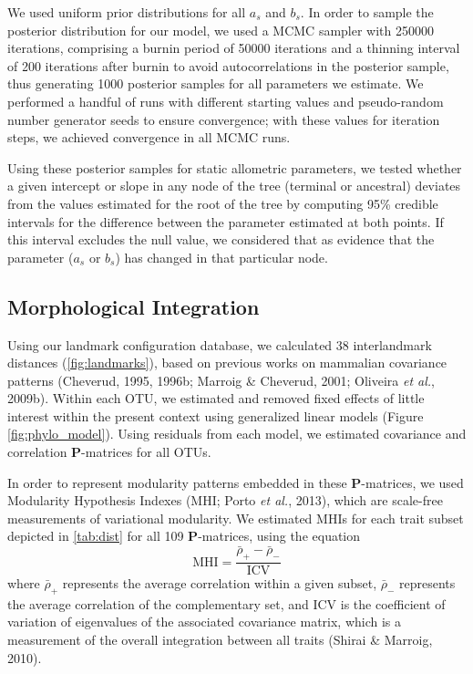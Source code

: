 \documentclass[12pt,twoside]{report}
\begin{document}
We used uniform prior distributions for all $a_s$ and $b_s$. In order to
sample the posterior distribution for our model, we used a MCMC sampler
with 250000 iterations, comprising a burnin period of 50000 iterations
and a thinning interval of 200 iterations after burnin to avoid
autocorrelations in the posterior sample, thus generating 1000 posterior
samples for all parameters we estimate. We performed a handful of runs
with different starting values and pseudo-random number generator seeds
to ensure convergence; with these values for iteration steps, we
achieved convergence in all MCMC runs.

Using these posterior samples for static allometric parameters, we
tested whether a given intercept or slope in any node of the tree
(terminal or ancestral) deviates from the values estimated for the root
of the tree by computing 95\% credible intervals for the difference
between the parameter estimated at both points. If this interval
excludes the null value, we considered that as evidence that the
parameter ($a_s$ or $b_s$) has changed in that particular node.

\subsection{Morphological Integration}\label{morphological-integration}

Using our landmark configuration database, we calculated 38
interlandmark distances (\autoref{fig:landmarks}), based on previous
works on mammalian covariance patterns (Cheverud, 1995, 1996b; Marroig
\& Cheverud, 2001; Oliveira \emph{et al.}, 2009b). Within each OTU, we
estimated and removed fixed effects of little interest within the
present context using generalized linear models (Figure
\ref{fig:phylo_model}). Using residuals from each model, we estimated
covariance and correlation $\mathbf{P}$-matrices for all OTUs.

In order to represent modularity patterns embedded in these
$\mathbf{P}$-matrices, we used Modularity Hypothesis Indexes (MHI; Porto
\emph{et al.}, 2013), which are scale-free measurements of variational
modularity. We estimated MHIs for each trait subset depicted in
\autoref{tab:dist} for all 109 $\mathbf{P}$-matrices, using the equation
\[
\text{MHI} = \frac {\bar{\rho}_{+} - \bar{\rho}_{-}} {\text{ICV}}
\] where $\bar{\rho}_{+}$ represents the average correlation within a
given subset, $\bar{\rho}_{-}$ represents the average correlation of the
complementary set, and $\text{ICV}$ is the coefficient of variation of
eigenvalues of the associated covariance matrix, which is a measurement
of the overall integration between all traits (Shirai \& Marroig, 2010).
\end{document}
